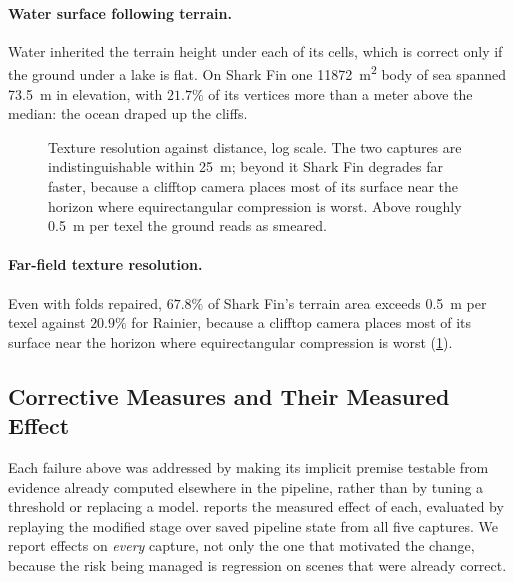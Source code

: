 \paragraph{Water surface following terrain.}
Water inherited the terrain height under each of its cells, which is correct only
if the ground under a lake is flat. On Shark Fin one \SI{11872}{\meter\squared}
body of sea spanned \SI{73.5}{\meter} in elevation, with $21.7\%$ of its vertices
more than a meter above the median: the ocean draped up the cliffs.

\begin{figure}[t]
  \centering
  \caption{Texture resolution against distance, log scale. The two captures are
  indistinguishable within \SI{25}{\meter}; beyond it Shark Fin degrades far
  faster, because a clifftop camera places most of its surface near the horizon
  where equirectangular compression is worst. Above roughly
  \SI{0.5}{\meter} per texel the ground reads as smeared.}
  \label{fig:texel}
\end{figure}

\paragraph{Far-field texture resolution.}
Even with folds repaired, $67.8\%$ of Shark Fin's terrain area exceeds
\SI{0.5}{\meter} per texel against $20.9\%$ for Rainier, because a clifftop camera
places most of its surface near the horizon where equirectangular compression is
worst (\cref{fig:texel}).

\subsection{Corrective Measures and Their Measured Effect}
\label{sec:remediation}

Each failure above was addressed by making its implicit premise testable from
evidence already computed elsewhere in the pipeline, rather than by tuning a
threshold or replacing a model.  reports the measured effect of
each, evaluated by replaying the modified stage over saved pipeline state from all
five captures. We report effects on \emph{every} capture, not only the one that
motivated the change, because the risk being managed is regression on scenes that
were already correct.

